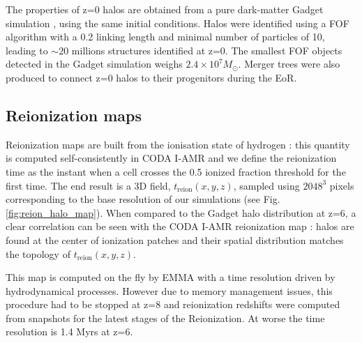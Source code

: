 \documentclass[twocolumn]{aastex61}
\newcommand{\dom}[1]{{#1}}
\begin{document}

The properties of z=0 halos are obtained from a pure dark-matter Gadget simulation \citep{SPR5}, using the same initial conditions. %
Halos were identified using a FOF algorithm with a 0.2 linking length and minimal number of particles of 10, leading to $\sim 20$ millions structures identified at z=0. The smallest FOF objects detected in the Gadget simulation weighs $2.4\times 10^7 M_\odot$. Merger trees were also produced to connect z=0 halos to their progenitors during the EoR. 



\subsection{Reionization maps}
Reionization maps are built from the ionisation state of  hydrogen : this quantity is computed self-consistently in CODA I-AMR and we define the reionization time as the  instant when a cell crosses  the 0.5 ionized fraction threshold for the first time.  The end result is a 3D field, $t_\mathrm{reion}(x,y,z)$, sampled using $2048^3$ pixels corresponding to the base resolution of our simulations (see Fig. \ref{fig:reion_halo_map}). When compared to the Gadget halo distribution at z=6,  a clear correlation can be seen with the CODA I-AMR reionization map : \dom{halos are found at the center of ionization patches and their spatial distribution matches the topology of $t_\mathrm{reion}(x,y,z)$}.

This map is computed on the fly by EMMA with a time resolution driven by hydrodynamical processes. However due  to memory management issues, this procedure had to be stopped at z=8 and reionization redshifts were computed from snapshots for the latest stages of the Reionization. At worse the time resolution is 1.4 Myrs at z=6.
\end{document}
